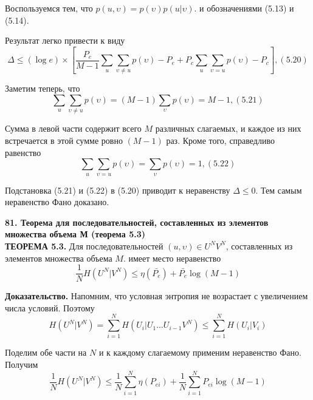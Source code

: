 \documentclass[14pt]{article}
\begin{document}
Воспользуемся тем, что \(p(u, \upsilon) = p(\upsilon)p(u|\upsilon)\). и обозначениями (5.13) и (5.14).

Результат легко привести к виду
\begin{displaymath}
    \Delta \leq (\log e) \times \left[ \frac{P_e}{M - 1}\sum_{u}\sum_{\upsilon \neq u} p(\upsilon)  - P_e + P_c \sum_{u}\sum_{\upsilon = u} p(\upsilon) - P_c \right], (5.20)
\end{displaymath}

Заметим теперь, что
\begin{displaymath}
    \sum_{u}\sum_{\upsilon \neq u} p(\upsilon) = (M - 1) \sum_{\upsilon} p(\upsilon) = M - 1, (5.21)
\end{displaymath}

Сумма в левой части содержит всего \(M\) различных слагаемых, и
каждое из них встречается в этой сумме ровно \((M - 1)\) раз. Кроме того,
справедливо равенство
\begin{displaymath}
    \sum_{u}\sum_{\upsilon = u} p(\upsilon) = \sum_{\upsilon} p(\upsilon) = 1, (5.22)
\end{displaymath}

Подстановка (5.21) и (5.22) в (5.20) приводит к неравенству \(\Delta \leq 0\).
Тем самым неравенство Фано доказано.

\bigskip
\textbf{81. Теорема для последовательностей, составленных из элементов множества объема М (теорема 5.3)} \\

\textbf{ТЕОРЕМА 5.3.} Для последовательностей \((u, \upsilon) \in U^N V^N\),
составленных из элементов множества объема \(M\). имеет место
неравенство
\begin{displaymath}
    \frac{1}{N}H(U^N|V^N) \leq \eta(\bar{P_e}) + \bar{P_e}\log(M - 1)
\end{displaymath}

\textbf{Доказательство.} Напомним, что условная энтропия не возрастает с увеличением числа условий. Поэтому
\begin{displaymath}
    H(U^N|V^N) = \sum_{i=1}^{N} H(U_i|U_1...U_{i-1}V^N) \leq \sum_{i=1}^{N} H(U_i|V_i)
\end{displaymath}

Поделим обе части на \(N\) и к каждому слагаемому применим
неравенство Фано. Получим
\begin{displaymath}
    \frac{1}{N}H(U^N|V^N) \leq \frac{1}{N}\sum_{i=1}^{N} \eta(P_{ei}) + \frac{1}{N}\sum_{i=1}^{N} P_{ei}\log(M - 1)
\end{displaymath}
\end{document}
